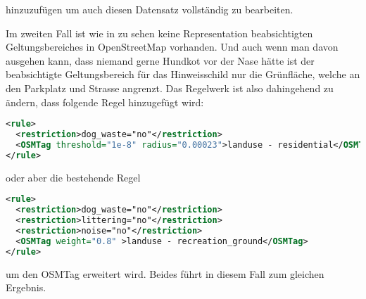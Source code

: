 hinzuzufügen um auch diesen Datensatz vollständig zu bearbeiten.


Im zweiten Fall ist wie in  zu sehen keine Representation
beabsichtigten Geltungsbereiches in OpenStreetMap vorhanden. Und auch wenn man davon
ausgehen kann, dass niemand gerne Hundkot vor der Nase hätte ist der beabsichtigte
Geltungsbereich für das Hinweisschild nur die Grünfläche, welche an den Parkplatz
und Strasse angrenzt.
Das Regelwerk ist also dahingehend zu ändern, dass folgende Regel hinzugefügt wird:
\begin{lstlisting}[language=xml,frame=single]
<rule>
  <restriction>dog_waste="no"</restriction>
  <OSMTag threshold="1e-8" radius="0.00023">landuse - residential</OSMTag>
</rule>
\end{lstlisting}
oder aber die bestehende Regel
\begin{lstlisting}[language=xml,frame=single]
<rule>
  <restriction>dog_waste="no"</restriction>
  <restriction>littering="no"</restriction>
  <restriction>noise="no"</restriction>
  <OSMTag weight="0.8" >landuse - recreation_ground</OSMTag>
</rule>
\end{lstlisting}
um den OSMTag erweitert wird.
Beides führt in diesem Fall zum gleichen Ergebnis.
